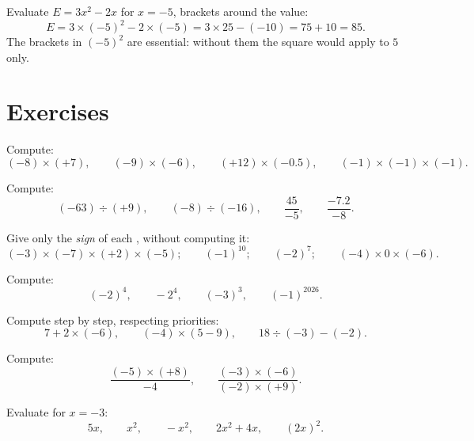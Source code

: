\begin{example}\label{ex:g8:negprod:substitute}
Evaluate $E = 3x^2 - 2x$ for $x = -5$, brackets around the value:
\[
E = 3 \times (-5)^2 - 2 \times (-5)
= 3 \times 25 - (-10)
= 75 + 10 = 85 .
\]
The brackets in $(-5)^2$ are essential: without them the square would
apply to $5$ only.
\end{example}

\section{Exercises}

\begin{exercise}[$\star$]\label{exo:g8:negprod:1}
Compute:
\[
(-8) \times (+7), \qquad
(-9) \times (-6), \qquad
(+12) \times (-0.5), \qquad
(-1) \times (-1) \times (-1).
\]
\end{exercise}

\begin{exercise}[$\star$]\label{exo:g8:negprod:2}
Compute:
\[
(-63) \div (+9), \qquad
(-8) \div (-16), \qquad
\frac{45}{-5}, \qquad
\frac{-7.2}{-8} .
\]
\end{exercise}

\begin{exercise}[$\star$]\label{exo:g8:negprod:3}
Give only the \emph{sign} of each , without computing it:
\[
(-3) \times (-7) \times (+2) \times (-5); \qquad
(-1)^{10}; \qquad
(-2)^{7}; \qquad
(-4) \times 0 \times (-6).
\]
\end{exercise}

\begin{exercise}[$\star$]\label{exo:g8:negprod:4}
Compute:
\[
(-2)^4, \qquad
-2^4, \qquad
(-3)^3, \qquad
(-1)^{2026} .
\]
\end{exercise}

\begin{exercise}[$\star$]\label{exo:g8:negprod:5}
Compute step by step, respecting priorities:
\[
7 + 2 \times (-6), \qquad
(-4) \times (5 - 9), \qquad
18 \div (-3) - (-2) .
\]
\end{exercise}

\begin{exercise}[$\star$]\label{exo:g8:negprod:6}
Compute:
\[
\frac{(-5) \times (+8)}{-4}, \qquad
\frac{(-3) \times (-6)}{(-2) \times (+9)} .
\]
\end{exercise}

\begin{exercise}[$\star$]\label{exo:g8:negprod:7}
Evaluate for $x = -3$:
\[
5x, \qquad x^2, \qquad -x^2, \qquad 2x^2 + 4x, \qquad (2x)^2 .
\]
\end{exercise}


